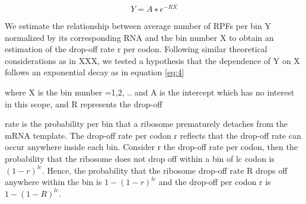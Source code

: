 \documentclass[a4,center,fleqn]{NAR}
\begin{document}
\begin{equation*} \label{eq:4}
Y=A∗e^{-RX}
\end{equation*}

We estimate the relationship between average number of RPFs per bin Y normalized by its corresponding RNA and the bin number X to obtain an estimation of the drop-off rate r per codon. Following similar theoretical considerations as in XXX, we tested a hypothesis that the dependence of Y on X follows an exponential decay as in equation \eqref{eq:4}

where X is the bin number =1,2, .. and A is the intercept which has no interest in this scope, and R represents the drop-off

rate is the probability per bin that a ribosome prematurely detaches from the mRNA template. The drop-off rate per codon r reflects that the drop-off rate can occur anywhere inside each bin. Consider r the drop-off rate per codon, then the probability that the ribosome does not drop off within a bin of lc codon is $(1-r)^{lc}$. 
Hence, the probability that the ribosome drop-off rate R drops off anywhere within the bin is $1-(1-r)^{lc} $ and the drop-off per codon r is $1-(1-R)^{lc}$.



 
\begin{table}[h]

\end{table}
\end{document}
